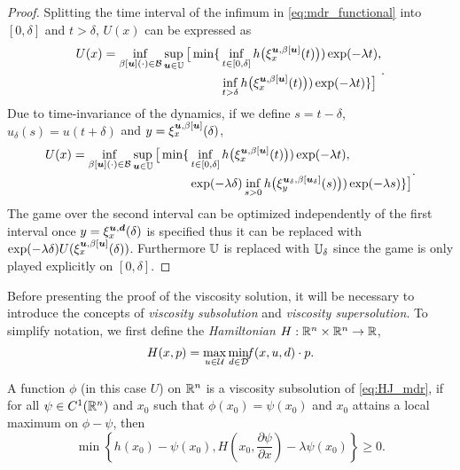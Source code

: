 \begin{for_journal}
\begin{proof}
Splitting the time interval of the infimum in \eqref{eq:mdr_functional} into $[0,\delta]$ and $t>\delta$, $U(x)$ can be expressed as
%
\begin{equation}
\begin{split}{}{}{}
U(x) =
\inf_{\beta[\bm{u}](\cdot) \in \mathcal{B}} \sup_{\bm{u} \in \mathbb{U}} 
\big [\min\{&\inf_{t \in [0, \delta]} h\big(\xi_{x}^{\bm{u},\beta[\bm{u}]}(t)\big))\exp(-\lambda  t),\\ &\inf_{t > \delta} h\big(\xi_{x}^{\bm{u},\beta[\bm{u}]}(t)\big))\exp(-\lambda  t)\}
\big ]
\end{split}.
\end{equation}
%
Due to time-invariance of the dynamics, if we define $s=t-\delta$, $u_\delta(s)=u(t+\delta)$ and $y=\xi_{x}^{\bm{u},\beta[\bm{u}]}(\delta)$,
%
\begin{equation}
\begin{split}
U(x) = 
\inf_{\beta[\bm{u}](\cdot) \in \mathcal{B}} \sup_{\bm{u} \in \mathbb{U}} 
\big [\min\{&\inf_{t \in [0, \delta]} h\big(\xi_{x}^{\bm{u},\beta[\bm{u}]}(t)\big))\exp(-\lambda  t), \\ &\exp(-\lambda \delta) \inf_{s > 0} h\big(\xi_{y}^{\bm{u}_\delta,\beta[\bm{u}_\delta]}(s)\big))\exp(-\lambda s)\}
\big ]
\end{split}.
\end{equation}
%
The game over the second interval can be optimized independently of the first interval once $y=\xi_{x}^{\bm{u},\bm{d}}(\delta)$ is specified thus it can be replaced with $\exp(-\lambda \delta)U(\xi_{x}^{\bm{u},\beta[\bm{u}]}(\delta))$. Furthermore $\mathbb{U}$ is replaced with $\mathbb{U}_\delta$ since the game is only played explicitly on $[0,\delta]$.
\end{proof}

Before presenting the proof of the viscosity solution, it will be necessary to introduce the concepts of \emph{viscosity subsolution} and \emph{viscosity supersolution}. To simplify notation, we first define the \emph{Hamiltonian} $H:\mathbb{R}^n \times \mathbb{R}^n \rightarrow \mathbb{R}$,
%
\begin{equation}\label{eq:hamiltonian}
H(x,p) = \max_{u\in\mathcal{U}} \min_{ d\in\mathcal{D}} \!\! f(x,u,d)\cdot p.
\end{equation}

\begin{definition} \label{def:sub_sol}
A function $\phi$ (in this case $U$) on $\mathbb{R}^n$  is a viscosity subsolution of \eqref{eq:HJ_mdr}, if for all $\psi \in C^1(\mathbb{R}^n)$ and $x_0$ such that $\phi(x_0) = \psi(x_0)$ and $x_0$ attains a local maximum on $\phi- \psi$, then
%
\begin{equation}\label{eq:sub_sol}
    \min\left\{h(x_0)-\psi(x_0), H(x_0,\frac{\partial \psi}{\partial x}) - \lambda \psi(x_0)\right\} \geq 0.
\end{equation}
\end{definition}
%


\end{for_journal}
